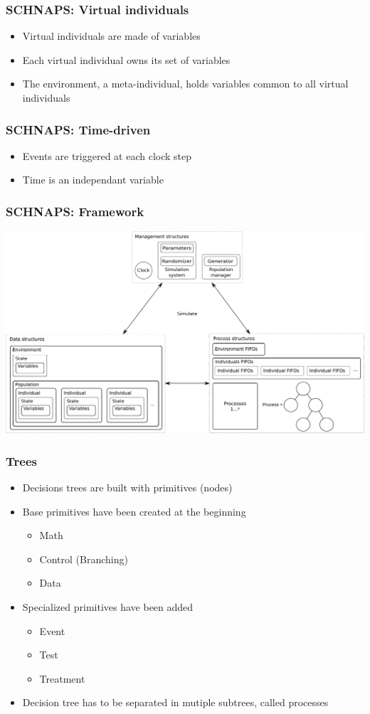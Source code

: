 \documentclass[notes, handout]{beamer}
\begin{document}
\begin{frame}
	\frametitle{SCHNAPS: Virtual individuals}
	\begin{itemize}
		\item<1-> Virtual individuals are made of variables
		\item<2-> Each virtual individual owns its set of variables
		\item<3-> The environment, a meta-individual, holds variables common to all virtual individuals
	\end{itemize}
\end{frame}

\begin{frame}
	\frametitle{SCHNAPS: Time-driven}
	\begin{itemize}
		\item Events are triggered at each clock step
		\item Time is an independant variable
	\end{itemize}
\end{frame}

\begin{frame}
	\frametitle{SCHNAPS: Framework}
	\includegraphics[width=\textwidth]{framework}
\end{frame}

\begin{frame}
	\frametitle{Trees}
	\begin{itemize}
		\item<1-> Decisions trees are built with primitives (nodes)
		\item<2-> Base primitives have been created at the beginning
			\begin{itemize}
				\item Math
				\item Control (Branching)
				\item Data
			\end{itemize}
		\item<3-> Specialized primitives have been added
			\begin{itemize}
				\item Event
				\item Test
				\item Treatment
			\end{itemize}
		\item<4-> Decision tree has to be separated in mutiple subtrees, called processes
	\end{itemize}
\end{frame}
\end{document}
